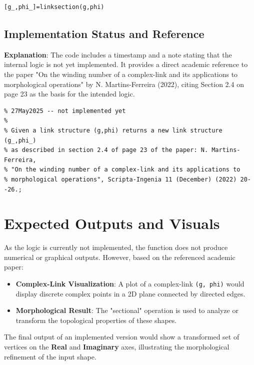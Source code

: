 \begin{lstlisting}
[g_,phi_]=linksection(g,phi)
\end{lstlisting}

\subsection{Implementation Status and Reference}
\textbf{Explanation}: The code includes a timestamp and a note stating that the internal logic is not yet implemented. It provides a direct academic reference to the paper "On the winding number of a complex-link and its applications to morphological operations" by N. Martins-Ferreira (2022), citing Section 2.4 on page 23 as the basis for the intended logic.

\begin{lstlisting}
% 27May2025 -- not implemented yet
%
% Given a link structure (g,phi) returns a new link structure (g_,phi_)  
% as described in section 2.4 of page 23 of the paper: N. Martins-Ferreira, 
% "On the winding number of a complex-link and its applications to 
% morphological operations", Scripta-Ingenia 11 (December) (2022) 20--26.;
\end{lstlisting}

\section{Expected Outputs and Visuals}



As the logic is currently not implemented, the function does not produce numerical or graphical outputs. However, based on the referenced academic paper:

\begin{itemize}
    \item \textbf{Complex-Link Visualization}: A plot of a complex-link \texttt{(g, phi)} would display discrete complex points in a 2D plane connected by directed edges.
    \item \textbf{Morphological Result}: The "sectional" operation is used to analyze or transform the topological properties of these shapes.
\end{itemize}

The final output of an implemented version would show a transformed set of vertices on the \textbf{Real} and \textbf{Imaginary} axes, illustrating the morphological refinement of the input shape.

